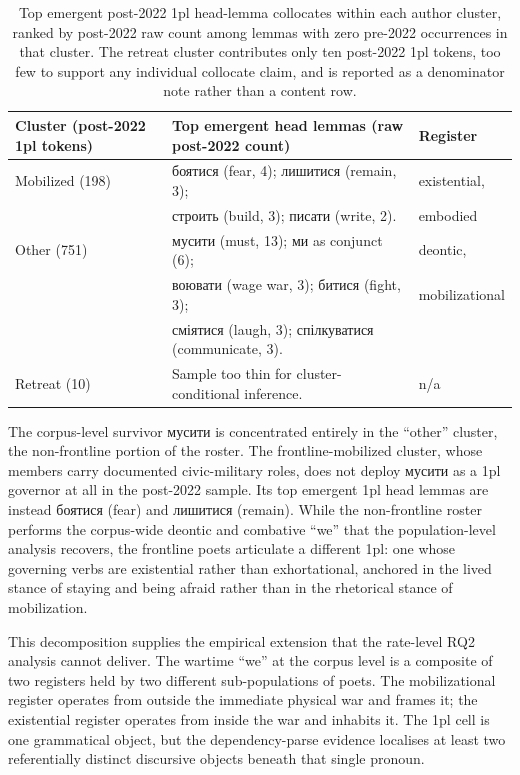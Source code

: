 \documentclass[12pt]{interact}
\theoremstyle{plain}%
\theoremstyle{definition}
\theoremstyle{remark}
\begin{document}
\begin{table}[h]
\centering
\caption{Top emergent post-2022 1pl head-lemma collocates within each author cluster, ranked by post-2022 raw count among lemmas with zero pre-2022 occurrences in that cluster. The retreat cluster contributes only ten post-2022 1pl tokens, too few to support any individual collocate claim, and is reported as a denominator note rather than a content row.}
\label{tab:rq3-cluster-1pl}
\small
\begin{tabular}{lll}
\toprule
Cluster (post-2022 1pl tokens) & Top emergent head lemmas (raw post-2022 count) & Register \\
\midrule
Mobilized (198) & \textukrainian{боятися} (fear, 4); \textukrainian{лишитися} (remain, 3); & existential, \\
                & \textukrainian{строить} (build, 3); \textukrainian{писати} (write, 2). & embodied \\
\addlinespace
Other (751)     & \textukrainian{мусити} (must, 13); \textukrainian{ми} as conjunct (6); & deontic, \\
                & \textukrainian{воювати} (wage war, 3); \textukrainian{битися} (fight, 3); & mobilizational \\
                & \textukrainian{сміятися} (laugh, 3); \textukrainian{спілкуватися} (communicate, 3). & \\
\addlinespace
Retreat (10)    & Sample too thin for cluster-conditional inference. & n/a \\
\bottomrule
\end{tabular}
\end{table}

The corpus-level survivor \textukrainian{мусити} is concentrated entirely in the ``other'' cluster, the non-frontline portion of the roster. The frontline-mobilized cluster, whose members carry documented civic-military roles, does not deploy \textukrainian{мусити} as a 1pl governor at all in the post-2022 sample. Its top emergent 1pl head lemmas are instead \textukrainian{боятися} (fear) and \textukrainian{лишитися} (remain). While the non-frontline roster performs the corpus-wide deontic and combative ``we'' that the population-level analysis recovers, the frontline poets articulate a different 1pl: one whose governing verbs are existential rather than exhortational, anchored in the lived stance of staying and being afraid rather than in the rhetorical stance of mobilization.

This decomposition supplies the empirical extension that the rate-level RQ2 analysis cannot deliver. The wartime ``we'' at the corpus level is a composite of two registers held by two different sub-populations of poets. The mobilizational register operates from outside the immediate physical war and frames it; the existential register operates from inside the war and inhabits it. The 1pl cell is one grammatical object, but the dependency-parse evidence localises at least two referentially distinct discursive objects beneath that single pronoun.
\end{document}
